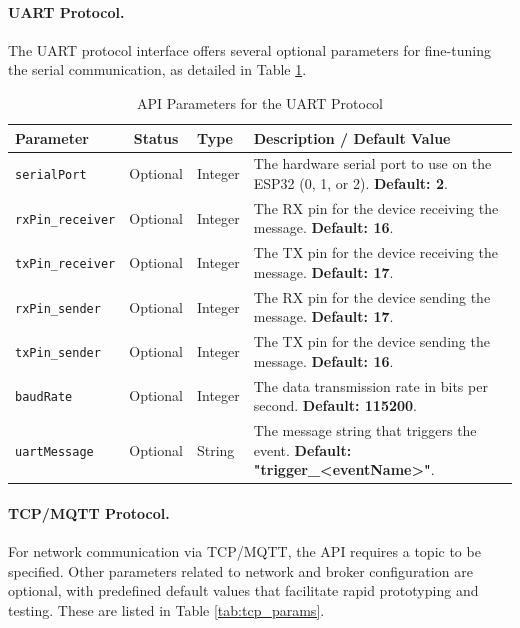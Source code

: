 \paragraph{UART Protocol.} The UART protocol interface offers several optional parameters for fine-tuning the serial communication, as detailed in Table \ref{tab:uart_params}.

\begin{table}[h!]
    \centering
    \caption{API Parameters for the UART Protocol}
    \label{tab:uart_params}
    \begin{tabular}{|l|c|l|p{6cm}|}
        \hline
        \textbf{Parameter} & \textbf{Status} & \textbf{Type} & \textbf{Description / Default Value} \\ \hline
        \texttt{serialPort} & Optional & Integer & The hardware serial port to use on the ESP32 (0, 1, or 2). \textbf{Default: 2}. \\ \hline
        \texttt{rxPin\_receiver} & Optional & Integer & The RX pin for the device receiving the message. \textbf{Default: 16}. \\ \hline
        \texttt{txPin\_receiver} & Optional & Integer & The TX pin for the device receiving the message. \textbf{Default: 17}. \\ \hline
        \texttt{rxPin\_sender} & Optional & Integer & The RX pin for the device sending the message. \textbf{Default: 17}. \\ \hline
        \texttt{txPin\_sender} & Optional & Integer & The TX pin for the device sending the message. \textbf{Default: 16}. \\ \hline
        \texttt{baudRate} & Optional & Integer & The data transmission rate in bits per second. \textbf{Default: 115200}. \\ \hline
        \texttt{uartMessage} & Optional & String & The message string that triggers the event. \textbf{Default: "trigger\_<eventName>"}. \\ \hline
    \end{tabular}
\end{table}

\paragraph{TCP/MQTT Protocol.} For network communication via TCP/MQTT, the API requires a topic to be specified. Other parameters related to network and broker configuration are optional, with predefined default values that facilitate rapid prototyping and testing. These are listed in Table \ref{tab:tcp_params}.

